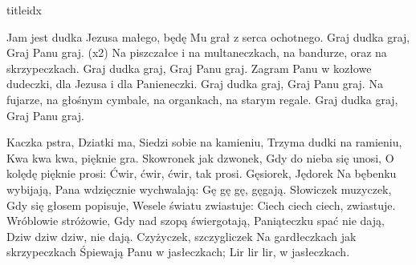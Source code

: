 \documentclass[a5paper, portrait, 12pt]{mwart}
\begin{document}
\begin{songs}{titleidx}


\beginverse
Jam jest dudka Jezusa małego,
będę Mu grał z serca ochotnego.
Graj dudka graj, Graj Panu graj. (x2)
\endverse
\beginverse
Na piszczałce i na multaneczkach,
na bandurze, oraz na skrzypeczkach.
Graj dudka graj, Graj Panu graj.
\endverse
\beginverse
Zagram Panu w kozłowe dudeczki,
dla Jezusa i dla Panieneczki.
Graj dudka graj, Graj Panu graj.
\endverse
\beginverse
Na fujarze, na głośnym cymbale,
na organkach, na starym regale.
Graj dudka graj, Graj Panu graj.
\endverse
\endsong


\beginverse
    Kaczka pstra, Dziatki ma,
\endverse
\beginchorus
    Siedzi sobie na kamieniu,
    Trzyma dudki na ramieniu,
    Kwa kwa kwa, pięknie gra.
\endchorus
\beginverse
    Skowronek jak dzwonek,
\endverse
\beginchorus
    Gdy do nieba się unosi,
    O kolędę pięknie prosi:
    Ćwir, ćwir, ćwir, tak prosi.
\endchorus
\beginverse
    Gęsiorek, Jędorek
\endverse
\beginchorus
    Na bębenku wybijają,
    Pana wdzięcznie wychwalają:
    Gę gę gę, gęgają.
\endchorus
\beginverse
    Słowiczek muzyczek,
\endverse
\beginchorus
    Gdy się głosem popisuje,
    Wesele światu zwiastuje:
    Ciech ciech ciech, zwiastuje.
\endchorus
\beginverse
    Wróblowie stróżowie,
\endverse
\beginchorus
    Gdy nad szopą świergotają,
    Paniąteczku spać nie dają,
    Dziw dziw dziw, nie dają.
\endchorus
\beginverse
    Czyżyczek, szczygliczek
\endverse
\beginchorus
    Na gardłeczkach jak skrzypeczkach
    Śpiewają Panu w jasłeczkach;
    Lir lir lir, w jasłeczkach.
\endchorus
\endsong

\end{songs}
\end{document}
